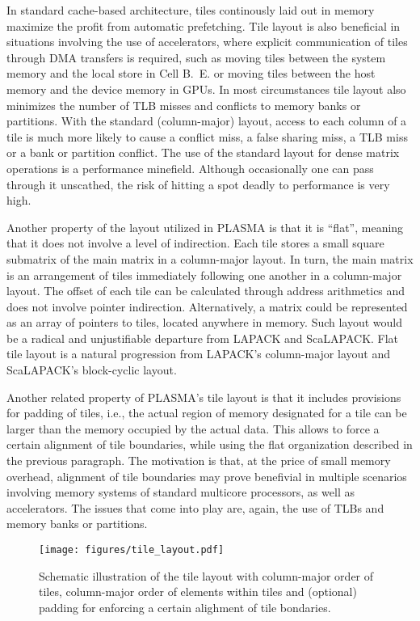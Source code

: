 In standard \mbox{cache-based} architecture, tiles continously laid out in memory maximize
the profit from automatic prefetching.
Tile layout is also beneficial in situations involving the use of accelerators, where explicit
communication of tiles through DMA transfers is required, such as
moving tiles between the system memory and the local store in Cell B.~E. or moving tiles between
the host memory and the device memory in GPUs.
In most circumstances tile layout also minimizes the number of TLB misses and conflicts to memory
banks or partitions.
With the standard (\mbox{column-major}) layout, access to each column of a tile is much more likely
to cause a conflict miss, a false sharing miss, a TLB miss or a bank or partition conflict.
The use of the standard layout for dense matrix operations is a performance minefield.
Although occasionally one can pass through it unscathed, the risk of hitting a spot deadly to
performance is very high.

Another property of the layout utilized in PLASMA is that it is ``flat'', meaning that it does
not involve a level of indirection. Each tile stores a small square submatrix of the main matrix
in a \mbox{column-major} layout. In turn, the main matrix is an arrangement of tiles immediately
following one another in a \mbox{column-major} layout.
The offset of each tile can be calculated through address arithmetics and does not involve pointer
indirection.
Alternatively, a matrix could be represented as an array of pointers to tiles, located anywhere
in memory. Such layout would be a radical and unjustifiable departure from LAPACK and ScaLAPACK.
Flat tile layout is a natural progression from LAPACK's \mbox{column-major} layout and ScaLAPACK's
\mbox{block-cyclic} layout.

Another related property of PLASMA's tile layout is that it includes provisions for padding of tiles,
i.e., the actual region of memory designated for a tile can be larger than the memory occupied by
the actual data.
This allows to force a certain alignment of tile boundaries, while using the flat organization
described in the previous paragraph.
The motivation is that, at the price of small memory overhead, alignment of tile boundaries may
prove benefivial in multiple scenarios involving memory systems of standard multicore processors,
as well as accelerators.
The issues that come into play are, again, the use of TLBs and memory banks or partitions.

\begin{SCfigure}
\centering
\texttt{[image: figures/tile\_layout.pdf]}
\caption{Schematic illustration of the tile layout with \mbox{column-major}
         order of tiles, \mbox{column-major} order of elements within tiles
         and (optional) padding for enforcing a certain alighment of tile bondaries.}
\label{fig:tile_layout}
\end{SCfigure}

